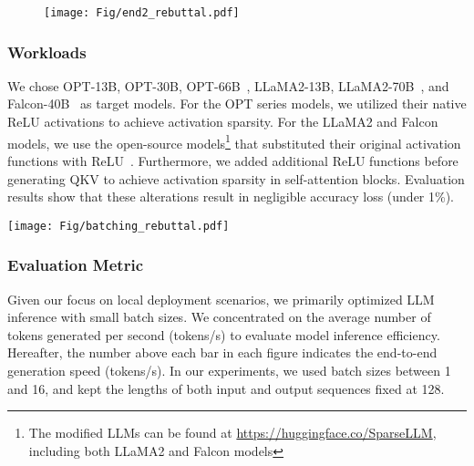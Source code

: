 \begin{figure}[t]
    \centering
    \texttt{[image: Fig/end2\_rebuttal.pdf]}
    \vspace{-0.3cm}
    \caption{}
    \label{fig:base-hermes-performance}
\vspace{-0.3cm}
\end{figure}

\subsubsection{Workloads}
We chose OPT-13B, OPT-30B, OPT-66B~\cite{zhang2022opt}, LLaMA2-13B, LLaMA2-70B~\cite{touvron2023llama2}, and Falcon-40B~\cite{almazrouei2023falcon} as target models. For the OPT series models, we utilized their native ReLU activations to achieve activation sparsity. For the LLaMA2 and Falcon models, we use the open-source models\footnote{The modified LLMs can be found at \href{https://huggingface.co/SparseLLM}{https://huggingface.co/SparseLLM}, including both LLaMA2 and Falcon models} that substituted their original activation functions with ReLU~\cite{mirzadeh2023relu, zhang2024relu}. Furthermore, we added additional ReLU functions before generating QKV to achieve activation sparsity in self-attention blocks. Evaluation results show that these alterations result in negligible accuracy loss (under 1\%). 

\begin{figure*}
    \centering
    \texttt{[image: Fig/batching\_rebuttal.pdf]}
    \vspace{-0.3cm}
    \caption{}
    \label{fig:batching-inference}
\vspace{-0.3cm}
\end{figure*}

\subsubsection{Evaluation Metric}
Given our focus on local deployment scenarios, we primarily optimized LLM inference with small batch sizes. We concentrated on the average number of tokens generated per second (tokens/s) to evaluate model inference efficiency. Hereafter, the number above each bar in each figure indicates the end-to-end generation speed (tokens/s). In our experiments, we used batch sizes between 1 and 16, and kept the lengths of both input and output sequences fixed at 128.


